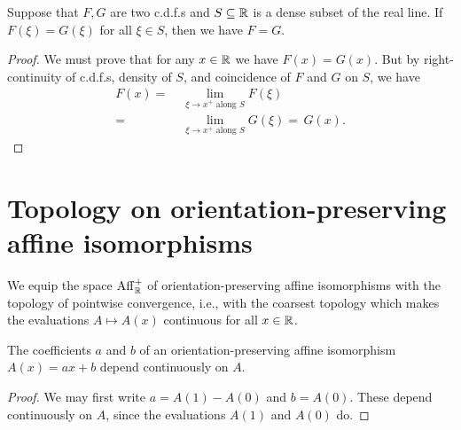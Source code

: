 \begin{lemma}
  \label{lem:cdf-equal-on-dense}
  \leanok
  Suppose that $F,G$ are two c.d.f.s and $S \subseteq \mathbb{R}$ is a dense
  subset of the real line. If $F(\xi) = G(\xi)$ for all $\xi \in S$,
  then we have $F = G$.
\end{lemma}
\begin{proof}
  We must prove that for any $x \in \mathbb{R}$ we have $F(x) = G(x)$.
  But by right-continuity of c.d.f.s, density of $S$, and coincidence of
  $F$ and $G$ on $S$, we have
  \begin{align*}
      F(x)
    = \; & \lim_{\xi \to x^+ \text{ along $S$}} F(\xi) \\
    = \; & \lim_{\xi \to x^+ \text{ along $S$}} G(\xi)
    = \, G(x) .
  \end{align*}
\end{proof}



\section{Topology on orientation-preserving affine isomorphisms}

\begin{definition}[]
  \label{def:affine-transform-topology}
  \leanok
  We equip the space $\mathrm{Aff}^+_{\mathbb{R}}$ of orientation-preserving affine isomorphisms
  with the topology of pointwise convergence, i.e., with the
  coarsest topology which makes the evaluations $A \mapsto A(x)$ continuous
  for all $x \in \mathbb{R}$.
\end{definition}

\begin{lemma}
  \label{lem:affine-coefficients-continuous}
  \leanok
  The coefficients $a$ and $b$ of an orientation-preserving affine isomorphism
  $A(x) = a x + b$ depend continuously on $A$.
\end{lemma}
\begin{proof}
  We may first write $a = A(1) - A(0)$ and $b = A(0)$.
  These depend continuously on $A$,
  since the evaluations $A(1)$ and $A(0)$ do.
\end{proof}

